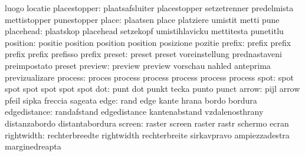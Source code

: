                            luogo                     locatie
             placestopper: plaatsafsluiter           placestopper
                           setzetrenner              predelmista
                           mettistopper              punestopper %
                    place: plaatsen                  place
                           platziere                 umistit
                           metti                     pune %
                placehead: plaatskop                 placehead
                           setzekopf                 umistihlavicku
                           mettitesta                punetitlu %
                 position: positie                   position
                           position                  position
                           posizione                 pozitie %
                   prefix: prefix                    prefix
                           prefix                    prefix
                           prefisso                  prefix
                   preset: preset                    preset
                           voreinstellung            prednastaveni
                           preimpostato              preset %
                  preview: preview                   preview
                           vorschau                  nahled
                           anteprima                 previzualizare
process: proces   process
         process  process
         process  process
   spot: spot spot
         spot spot
         spot spot
                      dot: punt                      dot
                           punkt                     tecka
                           punto                     punct
                    arrow: pijl                      arrow
                           pfeil                     sipka
                           freccia                   sageata
                     edge: rand                      edge
                           kante                     hrana
                           bordo                     bordura
             edgedistance: randafstand               edgedistance
                           kantenabstand             vzdalenosthrany
                           distanzabordo             distantabordura
                   screen: raster                    screen
                           raster                    rastr
                           schermo                   ecran
               rightwidth: rechterbreedte            rightwidth
                           rechterbreite             sirkavpravo
                           ampiezzadestra            marginedreapta
